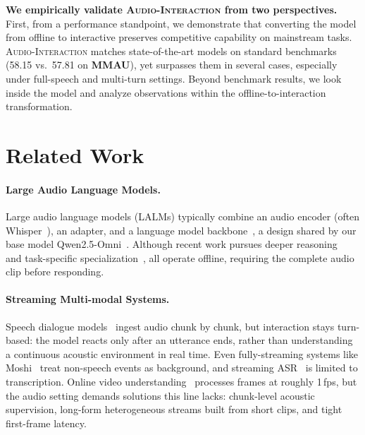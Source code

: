 \documentclass{article}
\begin{document}
\vspace{1mm}
\textbf{We empirically validate \textsc{Audio-Interaction} from two perspectives.} First, from a performance standpoint, we demonstrate that converting the model from offline to interactive preserves competitive capability on mainstream tasks. \textsc{Audio-Interaction} matches state-of-the-art models on standard benchmarks (58.15 vs.\ 57.81 on \textbf{MMAU}), yet surpasses them in several cases, especially under full-speech and multi-turn settings. Beyond benchmark results, we look inside the model and analyze observations within the offline-to-interaction transformation.

\section{Related Work}
\label{sec:related_work}
\vspace{-2mm}

\paragraph{Large Audio Language Models.}
Large audio language models (LALMs) typically combine an audio encoder (often Whisper~\citep{radford2023whisper}), an adapter, and a language model backbone~\citep{chu2024qwen2, tang2023salmonn, qwen25omni2025}, a design shared by our base model Qwen2.5-Omni~\citep{qwen25omni2025}. Although recent work pursues deeper reasoning~\citep{goel2025audio} and task-specific specialization~\citep{xu2025fireredasr}, all operate offline, requiring the complete audio clip before responding.

\vspace{-2mm}

\paragraph{Streaming Multi-modal Systems.}
Speech dialogue models~\citep{xie2024mini, fang2024llama, fang2025llamaomni2, defossez2024moshi, qwen25omni2025} ingest audio chunk by chunk, but interaction stays turn-based: the model reacts only after an utterance ends, rather than understanding a continuous acoustic environment in real time. Even fully-streaming systems like Moshi~\citep{defossez2024moshi} treat non-speech events as background, and streaming ASR~\citep{gao2022paramformer} is limited to transcription. Online video understanding~\citep{li2025videochat, chen2024videollm} processes frames at roughly 1\,fps, but the audio setting demands solutions this line lacks: chunk-level acoustic supervision, long-form heterogeneous streams built from short clips, and tight first-frame latency.
\end{document}
